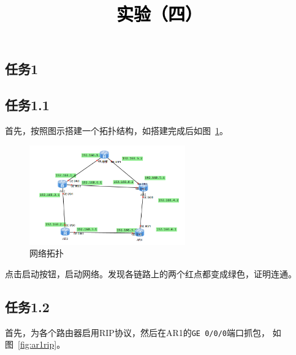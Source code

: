\documentclass[a4paper,twoside]{article}
\newcommand{\PaperTitle}{实验（四）}  %
\begin{document}
\newpage

\title{
	\Large{\textcolor{black}{\PaperTitle}}
}
	
	
\maketitle
	
\tableofcontents
 
\newpage
\setcounter{page}{1}

\begin{spacing}{1.2}

\section{任务1}

\subsection{任务1.1}

首先，按照图示搭建一个拓扑结构，如搭建完成后如图~\ref{fig:riptopo}。
\begin{figure}[htb]
	\centering
	\caption{网络拓扑}
	\label{fig:riptopo}
	\includegraphics[width=0.6\textwidth]{topo.png}
\end{figure}

点击启动按钮，启动网络。发现各链路上的两个红点都变成绿色，证明连通。

\subsection{任务1.2}

首先，为各个路由器启用RIP协议，然后在AR1的\texttt{GE 0/0/0}端口抓包，
如图~\ref{fig:ar1rip}。


\end{spacing}
\end{document}
